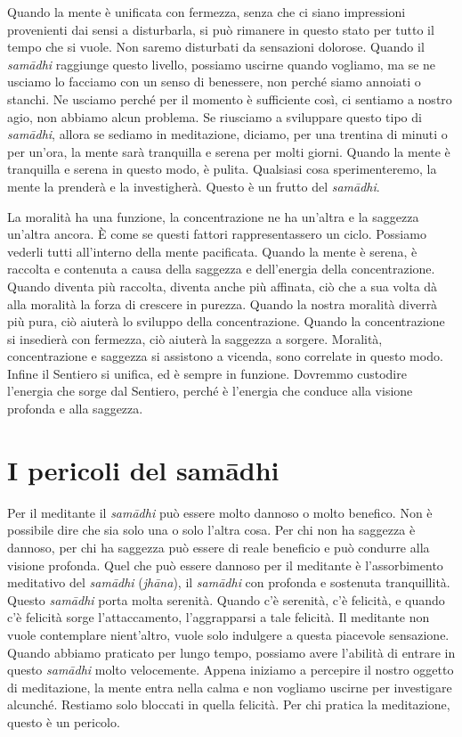 Quando la mente è unificata con fermezza, senza che ci siano impressioni
provenienti dai sensi a disturbarla, si può rimanere in questo stato per
tutto il tempo che si vuole. Non saremo disturbati da sensazioni
dolorose. Quando il \emph{samādhi} raggiunge questo livello, possiamo
uscirne quando vogliamo, ma se ne usciamo lo facciamo con un senso di
benessere, non perché siamo annoiati o stanchi. Ne usciamo perché per il
momento è sufficiente così, ci sentiamo a nostro agio, non abbiamo alcun
problema. Se riusciamo a sviluppare questo tipo di \emph{samādhi},
allora se sediamo in meditazione, diciamo, per una trentina di minuti o
per un'ora, la mente sarà tranquilla e serena per molti giorni. Quando
la mente è tranquilla e serena in questo modo, è pulita. Qualsiasi cosa
sperimenteremo, la mente la prenderà e la investigherà. Questo è un
frutto del \emph{samādhi}.

La moralità ha una funzione, la concentrazione ne ha un'altra e la
saggezza un'altra ancora. È come se questi fattori rappresentassero un
ciclo. Possiamo vederli tutti all'interno della mente pacificata. Quando
la mente è serena, è raccolta e contenuta a causa della saggezza e
dell'energia della concentrazione. Quando diventa più raccolta, diventa
anche più affinata, ciò che a sua volta dà alla moralità la forza di
crescere in purezza. Quando la nostra moralità diverrà più pura, ciò
aiuterà lo sviluppo della concentrazione. Quando la concentrazione si
insedierà con fermezza, ciò aiuterà la saggezza a sorgere. Moralità,
concentrazione e saggezza si assistono a vicenda, sono correlate in
questo modo. Infine il Sentiero si unifica, ed è sempre in funzione.
Dovremmo custodire l'energia che sorge dal Sentiero, perché è l'energia
che conduce alla visione profonda e alla saggezza.

\section{I pericoli del samādhi}

Per il meditante il \emph{samādhi} può essere molto dannoso o molto
benefico. Non è possibile dire che sia solo una o solo l'altra cosa. Per
chi non ha saggezza è dannoso, per chi ha saggezza può essere di reale
beneficio e può condurre alla visione profonda. Quel che può essere
dannoso per il meditante è l'assorbimento meditativo del \emph{samādhi}
(\emph{jhāna}), il \emph{samādhi} con profonda e sostenuta tranquillità.
Questo \emph{samādhi} porta molta serenità. Quando c'è serenità, c'è
felicità, e quando c'è felicità sorge l'attaccamento, l'aggrapparsi a
tale felicità. Il meditante non vuole contemplare nient'altro, vuole
solo indulgere a questa piacevole sensazione. Quando abbiamo praticato
per lungo tempo, possiamo avere l'abilità di entrare in questo
\emph{samādhi} molto velocemente. Appena iniziamo a percepire il nostro
oggetto di meditazione, la mente entra nella calma e non vogliamo
uscirne per investigare alcunché. Restiamo solo bloccati in quella
felicità. Per chi pratica la meditazione, questo è un pericolo.


